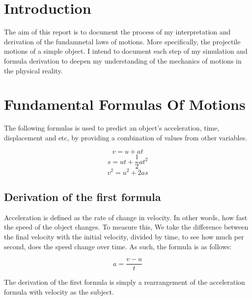 \documentclass[a4paper]{report}
\begin{document}
\tableofcontents



\newpage

\section{Introduction}

The aim of this report is to document the process of my interpretation and derivation of the fundamnetal laws of motions. More specifically, 
the projectile motions of a simple object. I intend to document each step of my simulation and formula derivation to 
deepen my understanding of the mechanics of motions in the physical reality. 

\section{Fundamental Formulas Of Motions}

The following formulas is used to predict an object's acceleration, time, displacement and etc, by providing a combination of values from other variables. 

\begin{equation}
    v = u + at
\end{equation}
\begin{equation}
    s = ut + \frac{1}{2}at^2 
\end{equation}
\begin{equation}
    v^2 = u^2 + 2as
\end{equation}
\subsection{Derivation of the first formula}

Acceleration is defined as the rate of change in velocity. In other words, how fast the speed of the object changes. To measure this,
We take the difference between the final velocity with the initial velocity, divided by time, to see how much per second, does the speed change over time. 
As such, the formula is as follows:

\begin{equation}
    a = \frac{v - u}{t}
\end{equation}

The derivation of the first formula is simply a rearrangement of the acceleration formula with velocity as the subject.
\end{document}
